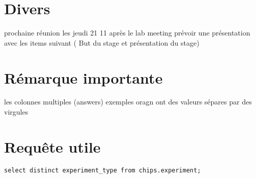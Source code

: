 \documentclass[12pt]{article}
\begin{document}
\section{Divers}
prochaine r\'{e}union les jeudi 21 11 après le lab meeting
pr\'{e}voir une pr\'{e}sentation avec les items suivant ( But du stage et pr\'{e}sentation du stage)

\section{R\'{e}marque importante}
les colonnes multiples (answers) exemples oragn ont des valeurs s\'{e}pares par des virgules

\section{Requ\^{e}te utile}

\begin{verbatim}
select distinct experiment_type from chips.experiment;
\end{verbatim}


\newpage

\end{document}
